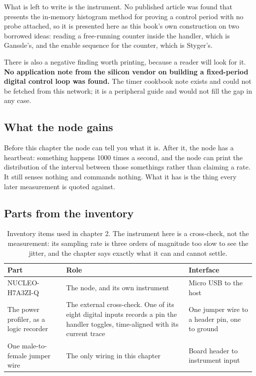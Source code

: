 What is left to write is the instrument. No published article was found that
presents the in-memory histogram method for proving a control period with no
probe attached, so it is presented here as this book's own construction on two
borrowed ideas: reading a free-running counter inside the handler, which is
Ganssle's, and the enable sequence for the counter, which is Styger's.

There is also a negative finding worth printing, because a reader will look for
it. \textbf{No application note from the silicon vendor on building a
fixed-period digital control loop was found.} The timer cookbook note exists and could not be
fetched from this network; it is a peripheral guide and would not fill the gap
in any case.

\subsection*{What the node gains}

Before this chapter the node can tell you what it is. After it, the node has a
heartbeat: something happens 1000 times a second, and the node can print the
distribution of the interval between those somethings rather than claiming a
rate. It still senses nothing and commands nothing. What it has is the thing
every later measurement is quoted against.

\subsection*{Parts from the inventory}

\begin{table}[H]\centering\small
\begin{tabular}{p{40mm}p{66mm}p{40mm}}
\toprule
Part & Role & Interface \\
\midrule
NUCLEO-H7A3ZI-Q & The node, and its own instrument & Micro USB to the host \\
The power profiler, as a logic recorder & The external cross-check. One of its eight digital inputs records a pin the handler toggles, time-aligned with its current trace & One jumper wire to a header pin, one to ground \\
One male-to-female jumper wire & The only wiring in this chapter & Board header to instrument input \\
\bottomrule
\end{tabular}
\caption{Inventory items used in chapter 2. The instrument here is a cross-check, not the measurement: its sampling rate is three orders of magnitude too slow to see the jitter, and the chapter says exactly what it can and cannot settle.}
\end{table}

